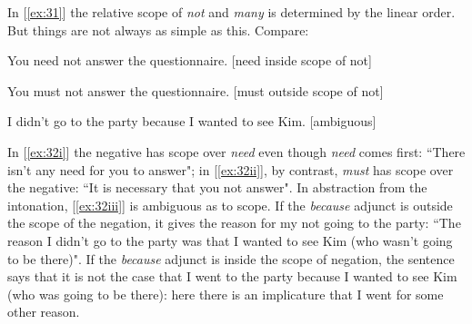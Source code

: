 In [\ref{ex:31}] the relative scope of \textit{not} and \textit{many} is determined by the linear order. But things are not always as simple as this. Compare:
\begin{examples}
\item \label{ex:32}
    \begin{examples}
        \item \label{ex:32i} You need not answer the questionnaire. \hfill \textnormal{[need inside scope of not]}
        \item \label{ex:32ii} You must not answer the questionnaire. \hfill \textnormal{[must outside scope of not]}
        \item \label{ex:32iii} I didn't go to the party because I wanted to see Kim. \hfill \textnormal{[ambiguous]}
    \end{examples}
\end{examples}
In [\ref{ex:32i}] the negative has scope over \textit{need} even though \textit{need} comes first: ``There isn't any need for you to answer"; in [\ref{ex:32ii}], by contrast, \textit{must} has scope over the negative: ``It is necessary that you not answer". In abstraction from the intonation, [\ref{ex:32iii}] is ambiguous as to scope. If the \textit{because} adjunct is outside the scope of the negation, it gives the reason for my not going to the party: ``The reason I didn't go to the party was that I wanted to see Kim (who wasn't going to be there)". If the \textit{because} adjunct is inside the scope of negation, the sentence says that it is not the case that I went to the party because I wanted to see Kim (who was going to be there): here there is an implicature that I went for some other reason.


